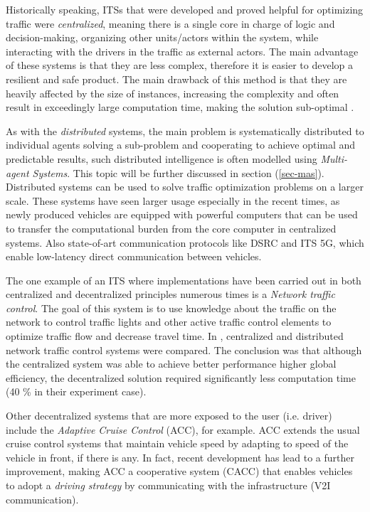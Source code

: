 \documentclass[main.tex]{subfiles}
\begin{document}
Historically speaking, ITSs that were
developed and proved helpful for optimizing traffic were \emph{centralized}, meaning there is a
single core in charge of logic and decision-making, organizing other units/actors within the
system, while interacting with the drivers in the traffic as external actors. The main
advantage of these systems is that they are less complex, therefore it is easier to develop a resilient and
safe product. The main drawback of this method is that they are heavily affected by the size
of instances, increasing the complexity and often result in exceedingly large computation time,
making the solution sub-optimal \cite{Corman2010}. 

As with the \emph{distributed} systems, the main problem is systematically distributed to
individual agents solving a sub-problem and cooperating to achieve optimal and predictable
results, such distributed intelligence is often modelled using \emph{Multi-agent Systems}. 
This topic will be further discussed in section (\ref{sec-mas}). Distributed systems can be used to
solve traffic optimization problems on a larger scale. These systems have seen larger usage
especially in the recent times, as newly produced vehicles are equipped with powerful computers
that can be used to transfer the computational burden from the core computer in centralized
systems. Also state-of-art communication protocols like DSRC and ITS 5G, which enable
low-latency direct communication between vehicles. 

The one example of an ITS where implementations have been carried out in both centralized and 
decentralized principles numerous times is a \emph{Network traffic control}. The goal of this 
system is to use knowledge about the traffic on the network to control traffic lights and other 
active traffic control elements to optimize traffic flow and decrease travel time. In \cite{Chow2019}, 
centralized and distributed network traffic control systems were compared. The conclusion was that 
although the centralized system was able to achieve better performance higher global efficiency, 
the decentralized solution required significantly less computation time (40 \% in their experiment case).

Other decentralized systems that are more exposed to the user (i.e. driver) include the 
\emph{Adaptive Cruise Control} (ACC), for example. ACC extends the usual cruise control systems 
that maintain vehicle speed by adapting to speed of the vehicle in front, if there is any. In fact, 
recent development has lead to a further improvement, making ACC a cooperative system (CACC) that 
enables vehicles to adopt a \emph{driving strategy} by communicating with the infrastructure (V2I 
communication).
\end{document}
